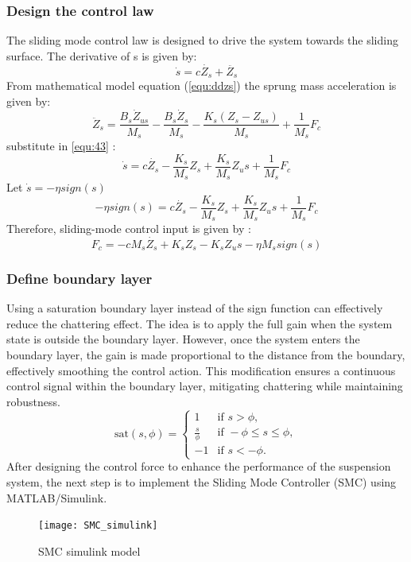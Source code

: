 \subsubsection{Design the control law}
The sliding mode control law is designed to drive the system towards the sliding surface.
The derivative of s is given by:
\begin{equation}
	\dot{s} = c\dot{Z_s}+\ddot{Z_s}
	\label{equ:43}
\end{equation}
From mathematical model equation (\ref*{equ:ddzs}) the sprung mass acceleration is given by:
\begin{equation}
	\ddot{Z}_s = \frac{B_s\dot{Z}_{us}}{M_s} - \frac{B_s\dot{Z}_s}{M_s} - \frac{K_s(Z_s - Z_{us})}{M_s} + \frac{1}{M_s}F_c
\end{equation}
substitute in \ref{equ:43} :
\begin{equation}
	\dot{s} = c\dot{Z_s}-\frac{K_s}{M_s}Z_s + \frac{K_s}{M_s}Z_us + \frac{1}{M_s}F_c
\end{equation}
Let $\dot{s} = -\eta sign\left(s\right) $
\begin{equation}
	-\eta sign\left(s\right)= c\dot{Z_s}-\frac{K_s}{M_s}Z_s + \frac{K_s}{M_s}Z_us + \frac{1}{M_s}F_c
\end{equation}
Therefore, sliding-mode control input is given by :
\begin{equation}
	F_c= -cM_s\dot{Z_s}+K_sZ_s - K_sZ_us -\eta M_s sign\left(s\right)
\end{equation}
\subsubsection{Define boundary layer}
Using a saturation boundary layer instead of the sign function can effectively reduce the chattering effect. The idea is to apply the full gain when the system state is outside the boundary layer. However, once the system enters the boundary layer, the gain is made proportional to the distance from the boundary, effectively smoothing the control action. This modification ensures a continuous control signal within the boundary layer, mitigating chattering while maintaining robustness.
\begin{equation}
	\text{sat}(s, \phi) =
	\begin{cases} 
		1 & \text{if } s > \phi, \\
		\frac{s}{\phi} & \text{if } -\phi \leq s \leq \phi, \\
		-1 & \text{if } s < -\phi.
	\end{cases}
\end{equation}
After designing the control force to enhance the performance of the suspension system, the next step is to implement the Sliding Mode Controller (SMC) using MATLAB/Simulink.
\begin{figure}[H]
	\centering
	\texttt{[image: SMC\_simulink]}
	\caption{SMC simulink model 
	}
	
\end{figure}
